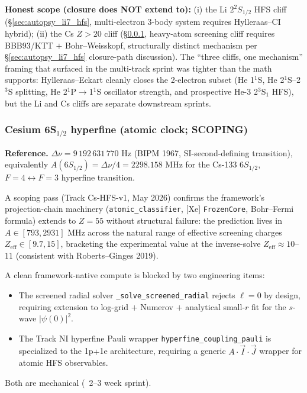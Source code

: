 \documentclass[11pt]{article}
\begin{document}
\textbf{Honest scope (closure does NOT extend to):}
(i) the Li $2^2S_{1/2}$ HFS cliff (\S\ref{sec:autopsy_li7_hfs}, multi-electron
3-body system requires Hylleraas--CI hybrid); (ii) the Cs $Z > 20$ cliff
(\S\ref{sec:autopsy_cs_hfs}, heavy-atom screening cliff requires BBB93/KTT
$+$ Bohr--Weisskopf, structurally distinct mechanism per \S\ref{sec:autopsy_li7_hfs}
closure-path discussion).  The ``three cliffs, one mechanism'' framing
that surfaced in the multi-track sprint was tighter than the math
supports: Hylleraas--Eckart cleanly closes the 2-electron subset
(He 1$^1$S, He 2$^1$S--2$^3$S splitting, He 2$^1$P$\to$1$^1$S oscillator
strength, and prospective He-3 2$^3$S$_1$ HFS), but the Li and Cs cliffs
are separate downstream sprints.

\subsubsection{Cesium 6S$_{1/2}$ hyperfine (atomic clock; SCOPING)}
\label{sec:autopsy_cs_hfs}

\textbf{Reference.}  $\Delta\nu = 9\,192\,631\,770$ Hz (BIPM 1967,
SI-second-defining transition), equivalently
$A(6S_{1/2}) = \Delta\nu/4 = 2298.158$ MHz for the
Cs-133 $6S_{1/2}$, $F=4 \leftrightarrow F=3$ hyperfine transition.

A scoping pass (Track Cs-HFS-v1, May 2026) confirms the framework's
projection-chain machinery (\texttt{atomic\_classifier}, [Xe]
\texttt{FrozenCore}, Bohr--Fermi formula) extends to $Z=55$ without
structural failure: the prediction lives in $A \in [793, 2931]$ MHz
across the natural range of effective screening charges
$Z_\text{eff} \in [9.7, 15]$, bracketing the experimental value at
the inverse-solve $Z_\text{eff} \approx 10$--$11$ (consistent with
Roberts--Ginges 2019).

A clean framework-native compute is blocked by two engineering items:
\begin{itemize}\setlength\itemsep{0pt}
\item The screened radial solver \texttt{\_solve\_screened\_radial}
rejects $\ell=0$ by design, requiring extension to log-grid $+$
Numerov $+$ analytical small-$r$ fit for the $s$-wave $|\psi(0)|^2$.
\item The Track NI hyperfine Pauli wrapper
\texttt{hyperfine\_coupling\_pauli} is specialized to the 1p$+$1e
architecture, requiring a generic $A \cdot \vec{I}\cdot \vec{J}$
wrapper for atomic HFS observables.
\end{itemize}
Both are mechanical (~2--3 week sprint).
\end{document}
